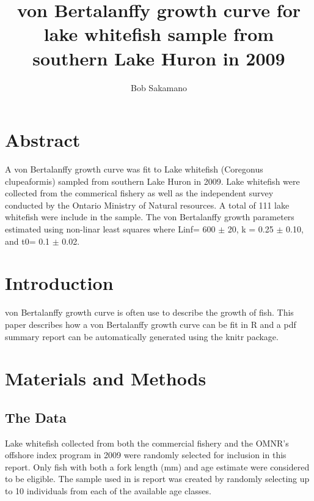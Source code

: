 \documentclass{article}
\begin{document}
\graphicspath{{figures/}}


\title{von Bertalanffy growth curve for lake whitefish sample from
       southern Lake Huron in 2009}

\author{Bob Sakamano}

\maketitle

\section*{Abstract}
\label{sec:abstract}

A von Bertalanffy growth curve was fit to Lake whitefish (Coregonus
clupeaformis) sampled from southern Lake Huron in 2009.  Lake
whitefish were collected from the commerical fishery as well as the
independent survey conducted by the Ontario Ministry of Natural
resources.  A total of 111 lake whitefish were include in the sample.
The von Bertalanffy growth parameters estimated using non-linar least
squares where Linf= 600 $\pm$ 20, k = 0.25 $\pm$ 0.10, and t0= 0.1
$\pm$ 0.02.


\section*{Introduction}
\label{sec:introduction}

von Bertalanffy growth curve is often use to describe the growth of
fish.  This paper describes how a von Bertalanffy growth curve can be
fit in R and a pdf summary report can be automatically generated using
the knitr package.

\section*{Materials and Methods}
\label{sec:Materials_and_Methods}

\subsection*{The Data}
\label{sub:the_data}

Lake whitefish collected from both the commercial fishery and the
OMNR's offshore index program in 2009 were randomly selected for
inclusion in this report.  Only fish with both a fork length (mm) and
age estimate were considered to be eligible.  The sample used in is
report was created by randomly selecting up to 10 individuals from each
of the available age classes.
\end{document}
